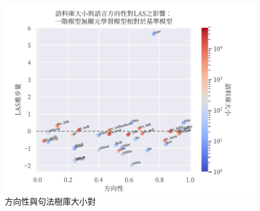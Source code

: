 \begin{figure}[h]
    \centering
    \includegraphics{figs/chapter3/dir_size_las_ft_fomaml-to-multi.pdf}
    \caption{方向性與句法樹庫大小對}
    \label{fig:dir-size-las-ft-fomaml-to-multi}
\end{figure}